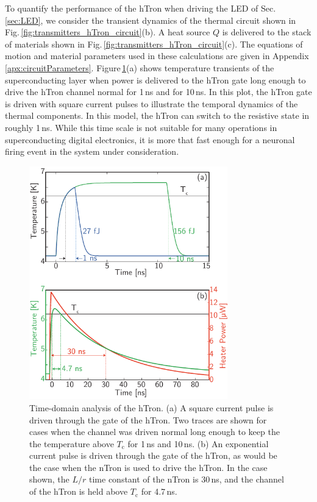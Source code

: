 \documentclass[aip,amsmath,amssymb,reprint,nofootinbib]{revtex4-1}
\begin{document}
To quantify the performance of the hTron when driving the LED of Sec.\,\ref{sec:LED}, we consider the transient dynamics of the thermal circuit shown in Fig.\,\ref{fig:transmitters_hTron_circuit}(b). A heat source $Q$ is delivered to the stack of materials shown in Fig.\,\ref{fig:transmitters_hTron_circuit}(c). The equations of motion and material parameters used in these calculations are given in Appendix \ref{apx:circuitParameters}. Figure\,\ref{fig:transmitters_hTron_data_1}(a) shows temperature transients of the superconducting layer when power is delivered to the hTron gate long enough to drive the hTron channel normal for 1\,ns and for 10\,ns. In this plot, the hTron gate is driven with square current pulses to illustrate the temporal dynamics of the thermal components. In this model, the hTron can switch to the resistive state in roughly 1\,ns. While this time scale is not suitable for many operations in superconducting digital electronics, it is more that fast enough for a neuronal firing event in the system under consideration.  
\begin{figure}[t!]
	\centerline{\includegraphics[width=8.6cm]{_transmitters_hTron_data_1_small.pdf}}
	\caption{\label{fig:transmitters_hTron_data_1}Time-domain analysis of the hTron. (a) A square current pulse is driven through the gate of the hTron. Two traces are shown for cases when the channel was driven normal long enough to keep the the temperature above $T_{\mathrm{c}}$ for 1\,ns and 10\,ns. (b) An exponential current pulse is driven through the gate of the hTron, as would be the case when the nTron is used to drive the hTron. In the case shown, the $L/r$ time constant of the nTron is 30\,ns, and the channel of the hTron is held above $T_{\mathrm{c}}$ for 4.7\,ns.}
\end{figure}
\end{document}
